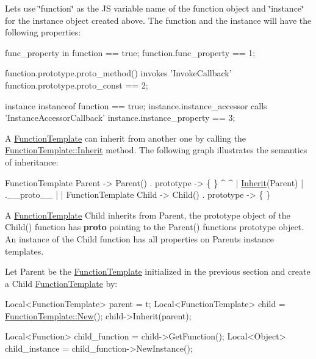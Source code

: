 Let\textquotesingle{}s use \char`\"{}function\char`\"{} as the J\+S variable name of the function object and \char`\"{}instance\char`\"{} for the instance object created above. The function and the instance will have the following properties\+:


\begin{DoxyCode}
func\_property in \textcolor{keyword}{function} == \textcolor{keyword}{true};
\textcolor{keyword}{function}.func\_property == 1;

\textcolor{keyword}{function}.prototype.proto\_method() invokes \textcolor{stringliteral}{'InvokeCallback'}
\textcolor{keyword}{function}.prototype.proto\_const == 2;

instance instanceof \textcolor{keyword}{function} == \textcolor{keyword}{true};
instance.instance\_accessor calls \textcolor{stringliteral}{'InstanceAccessorCallback'}
instance.instance\_property == 3;
\end{DoxyCode}


A \hyperlink{classv8_1_1_function_template}{Function\+Template} can inherit from another one by calling the \hyperlink{classv8_1_1_function_template_a18f343e7e5749ed886d6e76a1424216e}{Function\+Template\+::\+Inherit} method. The following graph illustrates the semantics of inheritance\+:


\begin{DoxyCode}
FunctionTemplate Parent  -> Parent() . prototype -> \{ \}
  ^                                                  ^
  | \hyperlink{classv8_1_1_function_template_a18f343e7e5749ed886d6e76a1424216e}{Inherit}(Parent)                                  | .\_\_proto\_\_
  |                                                  |
FunctionTemplate Child   -> Child()  . prototype -> \{ \}
\end{DoxyCode}


A \hyperlink{classv8_1_1_function_template}{Function\+Template} \textquotesingle{}Child\textquotesingle{} inherits from \textquotesingle{}Parent\textquotesingle{}, the prototype object of the Child() function has {\bfseries proto} pointing to the Parent() function\textquotesingle{}s prototype object. An instance of the Child function has all properties on Parent\textquotesingle{}s instance templates.

Let Parent be the \hyperlink{classv8_1_1_function_template}{Function\+Template} initialized in the previous section and create a Child \hyperlink{classv8_1_1_function_template}{Function\+Template} by\+:


\begin{DoxyCode}
Local<FunctionTemplate> parent = t;
Local<FunctionTemplate> child = \hyperlink{classv8_1_1_function_template_af9012aee4a102c4018fec8e9532cb996}{FunctionTemplate::New}();
child->Inherit(parent);

Local<Function> child\_function = child->GetFunction();
Local<Object> child\_instance = child\_function->NewInstance();
\end{DoxyCode}


